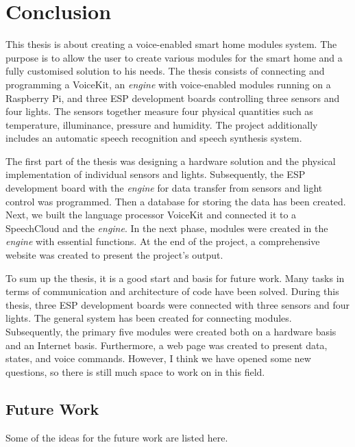 \chapter{Conclusion} \label{chap:conclusion}
This thesis is about creating a voice-enabled smart home modules system. The purpose is to allow the user to create various modules for the smart home and a fully customised solution to his needs. The thesis consists of connecting and programming a VoiceKit, an \textit{engine} with voice-enabled modules running on a Raspberry Pi, and three ESP development boards controlling three sensors and four lights. The sensors together measure four physical quantities such as temperature, illuminance, pressure and humidity. The project additionally includes an automatic speech recognition and speech synthesis system. 

The first part of the thesis was designing a hardware solution and the physical implementation of individual sensors and lights. Subsequently, the ESP development board with the \textit{engine} for data transfer from sensors and light control was programmed. Then a database for storing the data has been created. Next, we built the language processor VoiceKit and connected it to a SpeechCloud and the \textit{engine}. In the next phase, modules were created in the \textit{engine} with essential functions. At the end of the project, a comprehensive website was created to present the project's output. 

To sum up the thesis, it is a good start and basis for future work. Many tasks in terms of communication and architecture of code have been solved. During this thesis, three ESP development boards were connected with three sensors and four lights. The general system has been created for connecting modules. Subsequently, the primary five modules were created both on a hardware basis and an Internet basis. Furthermore, a web page was created to present data, states, and voice commands. However, I think we have opened some new questions, so there is still much space to work on in this field. 
\newpage
\section{Future Work} \label{sec:future_work}
Some of the ideas for the future work are listed here.

